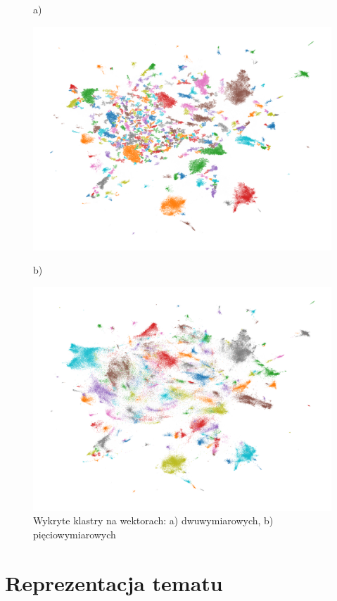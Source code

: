 	\begin{figure}[htb]
		\centering
		\begin{minipage}{.5\textwidth}
			a)\par\medskip %
			\includegraphics[width=\linewidth]{rys04/umap_15_100_1.png}
		\end{minipage}%
		\begin{minipage}{.5\textwidth}
			b)\par\medskip %
			\includegraphics[width=\linewidth]{rys04/umap_15_100_1_5d.png}
		\end{minipage}
		\caption{Wykryte klastry na wektorach: a) dwuwymiarowych, b) pięciowymiarowych}\label{fig:hdbscan} %
	\end{figure}

\section{Reprezentacja tematu}
